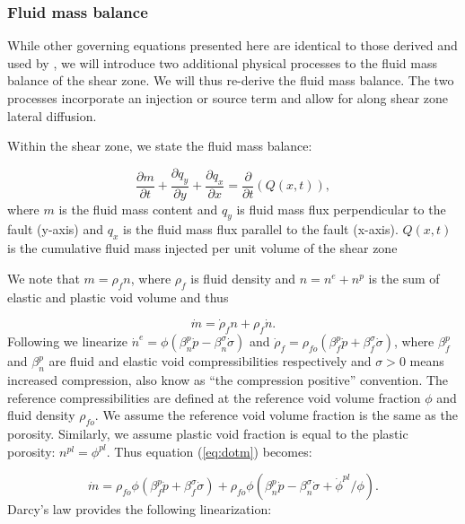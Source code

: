 \documentclass[draft]{agujournal2019}
\begin{document}
\subsubsection{Fluid mass balance} \label{sec:fluid}


While other governing equations presented here are identical to those derived and used by , we will introduce two additional physical processes to the fluid mass balance of the shear zone. We will thus re-derive the fluid mass balance. The two processes incorporate an injection or source term and allow for along shear zone lateral diffusion.

Within the shear zone, we state the fluid mass balance:

\begin{equation}
    \frac{\partial m}{\partial t} + \frac{\partial q_y}{\partial y} + \frac{\partial q_x}{\partial x}  = \frac{\partial}{\partial t} ( Q(x,t) ),
    \label{eq:cons}
\end{equation}
where $m$ is the fluid mass content and $q_y$ is fluid mass flux perpendicular to the fault (y-axis) and $q_x$ is the fluid mass flux parallel to the fault (x-axis). $Q(x,t)$ is the cumulative fluid mass injected per unit volume of the shear zone

We note that $m =  \rho_f n$, where $\rho_f$ is fluid density and $n = n^e + n^p$ is the sum of elastic and plastic void volume and thus

\begin{equation}
    \dot{m} = \dot{\rho}_f n + \rho_f \dot{n}.
    \label{eq:dotm}
\end{equation}
Following  we linearize $\dot{n}^e = \phi (\beta_n^p \dot{p} - \beta_n^{\sigma} \dot{\sigma} )$ and $\dot{\rho}_f = \rho_{fo}(\beta_f^p \dot{p} + \beta_f^\sigma \dot{\sigma} )$, where $\beta_f^p$ and $\beta_n^p$ are fluid and elastic void compressibilities respectively and $\sigma > 0$ means increased compression, also know as ``the compression positive'' convention. The reference compressibilities are defined at the reference void volume fraction $\phi$ and fluid density $\rho_{fo}$. We assume the reference void volume fraction is the same as the porosity. Similarly, we assume plastic void fraction is equal to the plastic porosity: $n^{pl} = \phi^{pl}$. Thus equation (\ref{eq:dotm}) becomes: 

\begin{equation}
    \dot{m} = \rho_{fo} \phi (\beta_f^p \dot{p} + \beta_f^\sigma \dot{\sigma} ) + \rho_{fo} \phi (\beta_n^p \dot{p} - \beta_n^{\sigma} \dot{\sigma} + \dot{\phi}^{pl}/\phi ).
    \label{eq:mdot}
\end{equation}
Darcy's law provides the following linearization:
\end{document}
